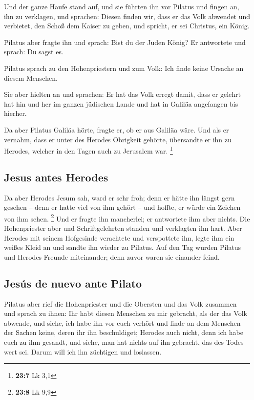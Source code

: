  Und der ganze Haufe stand auf, und sie führten ihn vor
Pilatus  und fingen an, ihn zu verklagen, und sprachen:
Diesen finden wir, dass er das Volk abwendet und verbietet, den Schoß
dem Kaiser zu geben, und spricht, er sei Christus, ein König.

 Pilatus aber fragte ihn und sprach: Bist du der Juden
König? Er antwortete und sprach: Du sagst es.

 Pilatus sprach zu den Hohenpriestern und zum Volk: Ich
finde keine Ursache an diesem Menschen.

 Sie aber hielten an und sprachen: Er hat das Volk erregt
damit, dass er gelehrt hat hin und her im ganzen jüdischen Lande und hat
in Galiläa angefangen bis hierher.

 Da aber Pilatus Galiläa hörte, fragte er, ob er aus
Galiläa wäre.  Und als er vernahm, dass er unter des
Herodes Obrigkeit gehörte, übersandte er ihn zu Herodes, welcher in den
Tagen auch zu Jerusalem war. \footnote{\textbf{23:7} Lk 3,1}

\hypertarget{jesus-antes-herodes}{%
\subsection{Jesus antes Herodes}\label{jesus-antes-herodes}}

 Da aber Herodes Jesum sah, ward er sehr froh; denn er
hätte ihn längst gern gesehen -- denn er hatte viel von ihm gehört --
und hoffte, er würde ein Zeichen von ihm sehen. \footnote{\textbf{23:8}
  Lk 9,9}  Und er fragte ihn mancherlei; er antwortete ihm
aber nichts.  Die Hohenpriester aber und Schriftgelehrten
standen und verklagten ihn hart.  Aber Herodes mit seinem
Hofgesinde verachtete und verspottete ihn, legte ihm ein weißes Kleid an
und sandte ihn wieder zu Pilatus.  Auf den Tag wurden
Pilatus und Herodes Freunde miteinander; denn zuvor waren sie einander
feind.

\hypertarget{jesuxfas-de-nuevo-ante-pilato}{%
\subsection{Jesús de nuevo ante
Pilato}\label{jesuxfas-de-nuevo-ante-pilato}}

 Pilatus aber rief die Hohenpriester und die Obersten und
das Volk zusammen  und sprach zu ihnen: Ihr habt diesen
Menschen zu mir gebracht, als der das Volk abwende, und siehe, ich habe
ihn vor euch verhört und finde an dem Menschen der Sachen keine, deren
ihr ihn beschuldiget;  Herodes auch nicht, denn ich habe
euch zu ihm gesandt, und siehe, man hat nichts auf ihn gebracht, das des
Todes wert sei.  Darum will ich ihn züchtigen und
loslassen.

